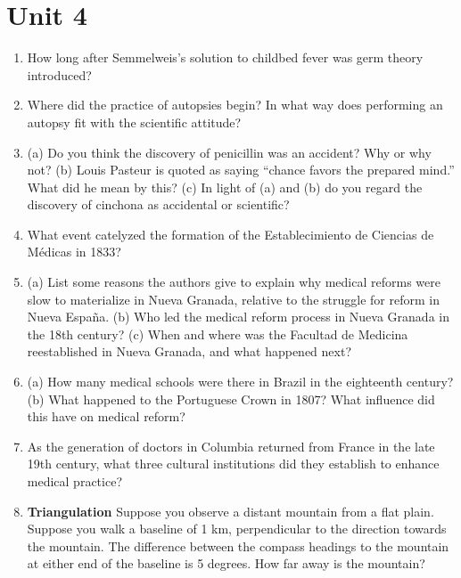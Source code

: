 \documentclass[10pt]{article}
\begin{document}
\section{Unit 4}

\begin{enumerate}
\item How long after Semmelweis’s solution to childbed fever was germ theory introduced? \\ \vspace{1cm}
\item Where did the practice of autopsies begin? In what way does performing an autopsy fit with the scientific
attitude? \\ \vspace{1cm}
\item (a) Do you think the discovery of penicillin was an accident?  Why or why not? (b) Louis Pasteur is quoted as saying ``chance favors the prepared mind.'' What did he mean by this? (c) In light of (a) and (b) do you regard the discovery of cinchona as accidental or scientific? \\ \vspace{1.5cm}
\item What event catelyzed the formation of the Establecimiento de Ciencias de M\'{e}dicas in 1833? \\ \vspace{1cm}
\item (a) List some reasons the authors give to explain why medical reforms were slow to materialize in Nueva Granada, relative to the struggle for reform in Nueva Espa\~{n}a. (b) Who led the medical reform process in Nueva Granada in the 18th century? (c) When and where was the Facultad de Medicina reestablished in Nueva Granada, and what happened next? \\ \vspace{2cm}
\item (a) How many medical schools were there in Brazil in the eighteenth century? (b) What happened to the Portuguese Crown in 1807? What influence did this have on medical reform? \\ \vspace{1cm}
\item As the generation of doctors in Columbia returned from France in the late 19th century, what three cultural institutions did they establish to enhance medical practice? \\ \vspace{1cm}
\item \textbf{Triangulation} Suppose you observe a distant mountain from a flat plain.  Suppose you walk a baseline of 1 km, perpendicular to the direction towards the mountain.  The difference between the compass headings to the mountain at either end of the baseline is 5 degrees.  How far away is the mountain? \\ \vspace{1.5cm}

\end{enumerate}
\end{document}

